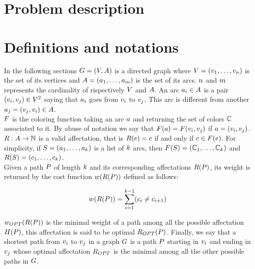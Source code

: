 \section{Problem description}

\section{Definitions and notations}

In the following sections $G = (V, A)$ is a directed graph where $V = (v_1,\ldots,v_{n})$ is the set of its vertices and $A = (a_1,\ldots,a_{m})$ is the set of its arcs. $n$ and $m$ represents the cardinality of rispectively $V$ and $A$. An arc $a_i \in A$ is a pair $(v_i, v_j) \in V^2$ saying that $a_i$ goes from $v_i$ to $v_j$. This arc is different from another $a_j = (v_j, v_i) \in A$.\\
$F$ is the coloring function taking an arc $a$ and returning the set of colors $\mathbb{C}$ associated to it. By abuse of notation we say that $F(a) = F(v_i, v_j)$ if $a = (v_i, v_j)$. $R: A \rightarrow \mathbb{N} $ is a valid affectation, that is $R(e) = c$ if and only if $c \in F(e)$. For simplicity, if $S = (a_1,\ldots,a_{k})$ is a list of $k$ arcs, then $F(S) = (\mathbb{C}_1,\ldots,\mathbb{C}_{k})$ and $R(S) = (c_1,\ldots,c_{k})$. \\
Given a path $P$ of length $k$ and its corresponding affectations $R(P)$, its weight is returned by the cost function $w(R(P))$ defined as follows:

$$ w(R(P)) = \sum\limits_{i = 1}^{k-1} (c_i \neq c_{i+1}) $$

$w_{OPT}(R(P))$ is the minimal weight of a path among all the possible affectation $H(P)$, this affectation is said to be optimal $R_{OPT}(P)$.
Finally, we say that a shortest path from $v_i$ to $v_j$ in a graph $G$ is a path $P$ starting in $v_i$ and ending in $v_j$ whose optimal affectation $R_{OPT}$ is the minimal among all the other possible paths in $G$.